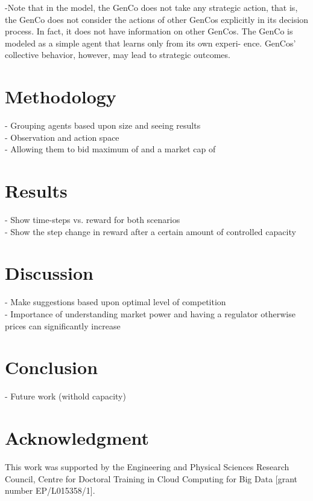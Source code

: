 \documentclass[conference]{IEEEtran}
\begin{document}
-Note that in the model, the GenCo does not take any strategic action, that is, the GenCo does not consider the actions of other GenCos explicitly in its decision process. In fact, it does not have information on other GenCos. The GenCo is modeled as a simple agent that learns only from its own experi- ence. GenCos’ collective behavior, however, may lead to strategic outcomes.\cite{EsmaeiliAliabadi2017}\\


\section{Methodology}
\label{sec:methodology}

- Grouping agents based upon size and seeing results\\
- Observation and action space \\
- Allowing them to bid maximum of  and a market cap of 



\section{Results}
\label{sec:results}

- Show time-steps vs. reward for both scenarios \\
- Show the step change in reward after a certain amount of controlled capacity

\section{Discussion}
\label{sec:discussion}

- Make suggestions based upon optimal level of competition \\
- Importance of understanding market power and having a regulator otherwise prices can significantly increase

\section{Conclusion}
\label{sec:conclusion}
- Future work (withold capacity)


\section{Acknowledgment}

This work was supported by the Engineering and Physical Sciences Research Council, Centre for Doctoral Training in Cloud Computing for Big Data [grant number EP/L015358/1].





\end{document}
